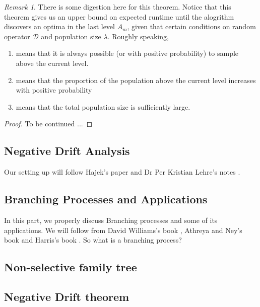 \documentclass[a4paper,11pt]{report}
\theoremstyle{plain} %
\theoremstyle{definition} %
\theoremstyle{remark} %
\newtheorem*{rem}{Remark}
\begin{document}
\begin{rem} There is some digestion here for this theorem. Notice that this theorem gives us an upper bound on expected runtime until the alogrithm discovers an optima in the last level $A_{m}$, given that certain conditions on random operator $\mathcal{D}$ and population size $\lambda$. Roughly speaking, 
\begin{enumerate}[(G1)]
    \item means that it is always possible (or with positive probability) to sample above the current level.
    
    \item means that the proportion of the population above the current level increases with positive probability
    
    \item means that the total population size is sufficiently large.
\end{enumerate}

\end{rem}

\begin{proof}
To be continued ...
\end{proof}

\subsection{Negative Drift Analysis}
Our setting up will follow Hajek's paper \citep{hajek1982hitting} and Dr Per Kristian Lehre's notes \citep{Per}.

\subsection{Branching Processes and Applications}
\par In this part, we properly discuss Branching processes and some of its applications. We will follow from David Williams's book \citep{williams1991probability}, Athreya and Ney's book \citep{athreya2004branching} and Harris's book \citep{harris1963theory}.  So what is a branching process? 

\subsection{Non-selective family tree}


\subsection{Negative Drift theorem}
\end{document}
